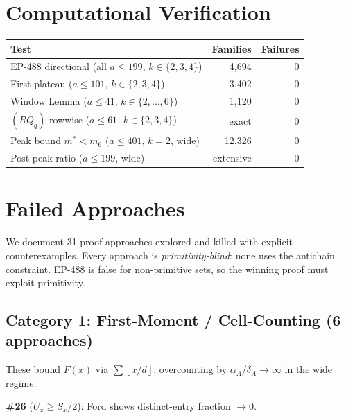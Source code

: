 \documentclass[11pt,a4paper]{article}
\theoremstyle{definition}
\newcommand{\floor}[1]{\left\lfloor #1 \right\rfloor}
\begin{document}
\section{Computational Verification}

\begin{center}
\begin{tabular}{lrr}
\toprule
\textbf{Test} & \textbf{Families} & \textbf{Failures} \\
\midrule
EP-488 directional (all $a \leq 199$, $k \in \{2,3,4\}$) & 4{,}694 & 0 \\
First plateau ($a \leq 101$, $k \in \{2,3,4\}$) & 3{,}402 & 0 \\
Window Lemma ($a \leq 41$, $k \in \{2,\ldots,6\}$) & 1{,}120 & 0 \\
$(RQ_q)$ rowwise ($a \leq 61$, $k \in \{2,3,4\}$) & exact & 0 \\
Peak bound $m^* < m_6$ ($a \leq 401$, $k=2$, wide) & 12{,}326 & 0 \\
Post-peak ratio ($a \leq 199$, wide) & extensive & 0 \\
\bottomrule
\end{tabular}
\end{center}

\section{Failed Approaches}

We document 31 proof approaches explored and killed with explicit 
counterexamples. Every approach is \emph{primitivity-blind}: none uses the 
antichain constraint. EP-488 is false for non-primitive sets, so the winning 
proof must exploit primitivity.

\subsection{Category 1: First-Moment / Cell-Counting (6 approaches)}

These bound $F(x)$ via $\sum \floor{x/d}$, overcounting by 
$\alpha_A / \delta_A \to \infty$ in the wide regime.

\textbf{\#26} ($U_x \geq S_x/2$): Ford shows distinct-entry fraction $\to 0$.
\end{document}

